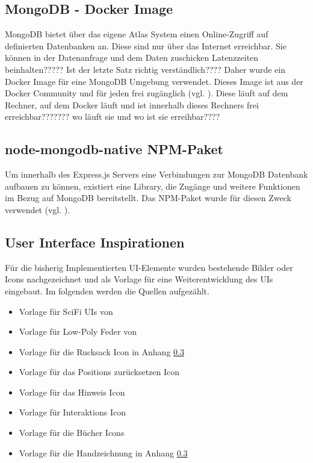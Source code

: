 \subsection{MongoDB - Docker Image}
MongoDB bietet über das eigene Atlas System einen Online-Zugriff auf definierten Datenbanken an. Diese sind nur über das Internet erreichbar. Sie können in der Datenanfrage und dem Daten zuschicken Latenzzeiten beinhalten????? Ist der letzte Satz richtig verständlich???? Daher wurde ein Docker Image für eine MongoDB Umgebung verwendet. Dieses Image ist aus der Docker Community und für jeden frei zugänglich (vgl. \cite{noauthor_mongo_nodate}). Diese läuft auf dem Rechner, auf dem Docker läuft und ist innerhalb dieses Rechners frei erreichbar??????? wo läuft sie und wo ist sie erreihbar????

\subsection{node-mongodb-native NPM-Paket}
Um innerhalb des Express.js Servers eine Verbindungen zur MongoDB Datenbank aufbauen zu können, existiert eine Library, die Zugänge und weitere Funktionen im Bezug auf MongoDB bereitstellt. Das \ac{NPM}-Paket  wurde für diesen Zweck verwendet (vgl. \cite{mongodb_mongodbnode-mongodb-native_2025}).


\subsection{User Interface Inspirationen}
Für die bisherig Implementierten \ac{UI}-Elemente wurden bestehende Bilder oder Icons nachgezeichnet und als Vorlage für eine Weiterentwicklung des \ac{UI}s eingebaut. Im folgenden werden die Quellen aufgezählt.

\begin{itemize}
    \item Vorlage für SciFi \ac{UI}s von \cite{pchvector_free_nodate}
    \item Vorlage für Low-Poly Feder von \cite{masud_download_nodate}
    \item Vorlage für die Rucksack Icon in Anhang \ref{}
    \item Vorlage für das Positions zurücksetzen Icon \cite{noauthor_chatgpt_nodate-3}
    \item Vorlage für das Hinweis Icon \cite{noauthor_chatgpt_nodate-2}
    \item Vorlage für Interaktions Icon \cite{noauthor_chatgpt_nodate-1}
    \item Vorlage für die Bücher Icons \cite{noauthor_chatgpt_nodate}
    \item Vorlage für die Handzeichnung in Anhang \ref{}
\end{itemize}

